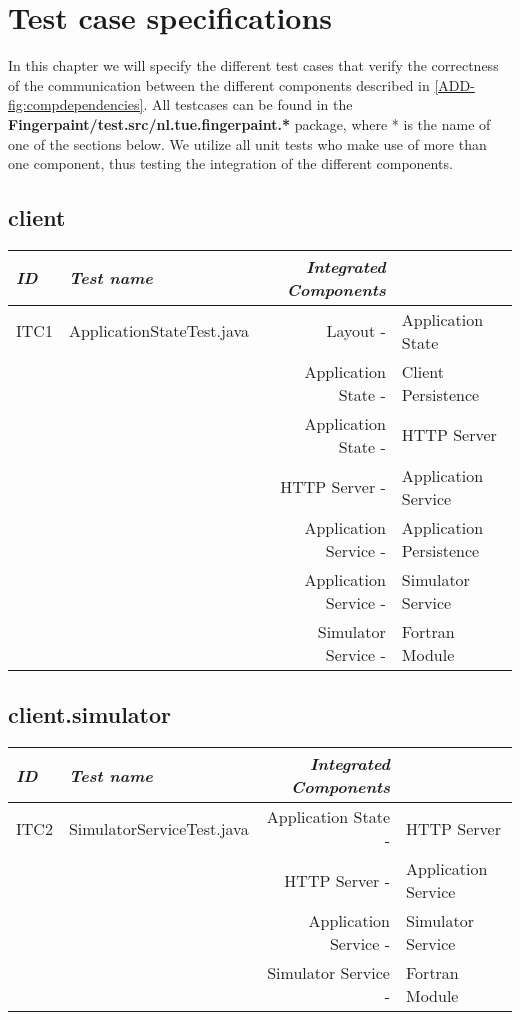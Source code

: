 \chapter{Test case specifications}\label{chap:testSpecs}

In this chapter we will specify the different test cases that verify the correctness of the communication between the different components described in \ref{ADD-fig:compdependencies}. All testcases can be found in the \textbf{Fingerpaint/test.src/nl.tue.fingerpaint.*} package, where * is the name of one of the sections below. We utilize all unit tests who make use of more than one component, thus testing the integration of the different components.


\section{client}
\begin{tabular}{llrl}
\emph{ID} & \emph{Test name} & \emph{Integrated Components} & \\
\hline
ITC1 & ApplicationStateTest.java & Layout - & Application State \\
& & Application State - & Client Persistence \\
& & Application State - & HTTP Server \\
& & HTTP Server - & Application Service \\
& & Application Service - & Application Persistence\\
& & Application Service - & Simulator Service\\
& & Simulator Service - & Fortran Module \\
\end{tabular}

\section{client.simulator}
\begin{tabular}{llrl}
\emph{ID} & \emph{Test name} & \emph{Integrated Components} & \\
\hline
ITC2 & SimulatorServiceTest.java & Application State - & HTTP Server \\
& & HTTP Server - & Application Service \\
& & Application Service - & Simulator Service \\
& & Simulator Service - & Fortran Module\\
\end{tabular}

